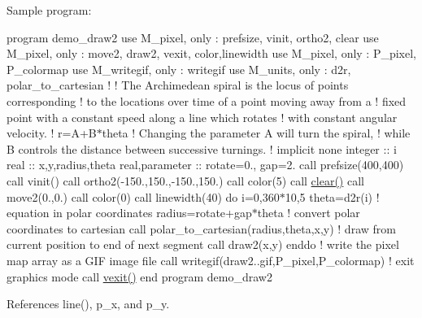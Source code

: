 Sample program\+:

program demo\+\_\+draw2 use M\+\_\+pixel, only \+: prefsize, vinit, ortho2, clear use M\+\_\+pixel, only \+: move2, draw2, vexit, color,linewidth use M\+\_\+pixel, only \+: P\+\_\+pixel, P\+\_\+colormap use M\+\_\+writegif, only \+: writegif use M\+\_\+units, only \+: d2r, polar\+\_\+to\+\_\+cartesian ! ! The Archimedean spiral is the locus of points corresponding ! to the locations over time of a point moving away from a ! fixed point with a constant speed along a line which rotates ! with constant angular velocity. ! r=A+\+B$\ast$theta ! Changing the parameter A will turn the spiral, ! while B controls the distance between successive turnings. ! implicit none integer \+:\+: i real \+:\+: x,y,radius,theta real,parameter \+:\+: rotate=0., gap=2. call prefsize(400,400) call vinit(\textquotesingle{}\textquotesingle{}) call ortho2(-\/150.,150.,-\/150.,150.) call color(5) call \hyperlink{namespacem__pixel_af3b81a21a0b2f6b5eddd09c031bd6173}{clear()} call move2(0.,0.) call color(0) call linewidth(40) do i=0,360$\ast$10,5 theta=d2r(i) ! equation in polar coordinates radius=rotate+gap$\ast$theta ! convert polar coordinates to cartesian call polar\+\_\+to\+\_\+cartesian(radius,theta,x,y) ! draw from current position to end of next segment call draw2(x,y) enddo ! write the pixel map array as a G\+IF image file call writegif(\textquotesingle{}draw2..\+gif\textquotesingle{},P\+\_\+pixel,P\+\_\+colormap) ! exit graphics mode call \hyperlink{namespacem__pixel_a19ad6b65752322b0029a62cc0ebec3e8}{vexit()} end program demo\+\_\+draw2 

References line(), p\+\_\+x, and p\+\_\+y.

